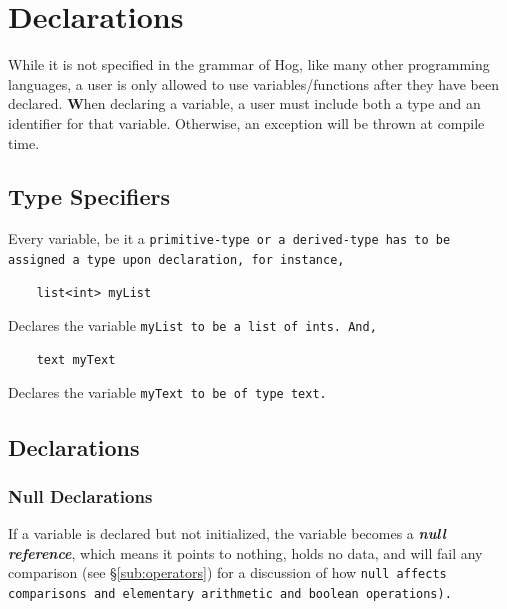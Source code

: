 \documentclass{article}
\begin{document}



\section{Declarations} %
\label{sec:declarations}

While it is not specified in the grammar of Hog, like many other programming
languages, a user is only allowed to use variables/functions after they have been
declared. \textbf When declaring a variable, a user must include both a type and an 
identifier for that variable. Otherwise, an exception will be thrown at compile time.

\subsection{Type Specifiers} %
\label{sub:type_specifiers}

Every variable, be it a \tt primitive-type \rm or a \tt derived-type \rm has to be
assigned a type upon declaration, for instance,

\begin{verbatim}
    list<int> myList
\end{verbatim}

Declares the variable \tt myList \rm to be a \tt list \rm of \tt int\rm s. And,

\begin{verbatim}
    text myText
\end{verbatim}

Declares the variable \tt myText \rm to be of type \tt text\rm .


\subsection{Declarations} %
\label{sub:declarations}

\subsubsection{Null Declarations} %
\label{ssub:null_declarations}

If a variable is declared but not initialized, the variable becomes a
\textbf{\emph{null reference}}, which means it points to nothing, holds no data,
and will fail any comparison (see \S \ref{sub:operators}) for a discussion of how
\tt null \rm affects comparisons and elementary arithmetic and boolean operations).
\end{document}
